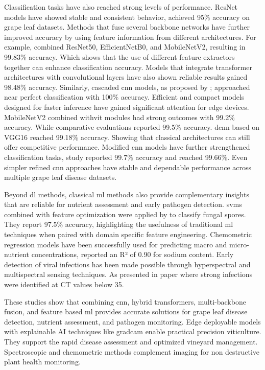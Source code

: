 \documentclass[conference]{IEEEtran}
\begin{document}
Classification tasks have also reached strong levels of performance. ResNet models have showed stable and consistent behavior, \cite{Sagar2025} achieved 95\% accuracy on grape leaf datasets. Methods that fuse several backbone networks have further improved accuracy by using feature information from different architectures. For example, \cite{Vo2026AFCNet} combined ResNet50, EfficientNetB0, and MobileNetV2, resulting in 99.83\% accuracy. Which shows that the use of different feature extractors together can enhance classification accuracy. Models that integrate transformer architectures with convolutional layers have also shown reliable results \cite{Zhang2025Transformer} gained 98.48\% accuracy. Similarly, cascaded \ac{cnn} models, as proposed by \cite{AlNasseri2025}; approached near perfect classification with 100\% accuracy. Efficient and compact models designed for faster inference have gained significant attention for edge devices. MobileNetV2 combined with\ac{vit} modules \cite{Tanvir2025} had strong outcomes with 99.2\% accuracy. While comparative evaluations \cite{Mathew2025} reported 99.5\% accuracy. \ac{dcnn} based on VGG16 \cite{Prasad2024} reached 99.18\% accuracy. Showing that classical architectures can still offer competitive performance. Modified \ac{cnn} models have further strengthened classification tasks, study \cite{Talaat2025} reported 99.7\% accuracy and \cite{Karim2024} reached 99.66\%. Even simpler refined \ac{cnn} approaches \cite{Naik2025} have stable and dependable performance across multiple grape leaf disease datasets.

Beyond \ac{dl} methods, classical \ac{ml} methods also provide complementary insights that are reliable for nutrient assessment and early pathogen detection. \ac{svm}s combined with feature optimization  were applied by \cite{Shi2025} to classify fungal spores. They report 97.5\% accuracy, highlighting the usefulness of traditional \ac{ml} techniques when paired with domain specific feature engineering. Chemometric regression models have been successfully used for predicting macro and micro-nutrient concentrations, \cite{Manzano2025} reported an R² of 0.90 for sodium content. Early detection of viral infections has been made possible through hyperspectral and multispectral sensing techniques. As presented in paper \cite{Lee2024} where strong infections were identified at CT values below 35.

These studies show that combining \ac{cnn}, hybrid transformers, multi-backbone fusion, and feature based \ac{ml} provides accurate solutions for grape leaf disease detection, nutrient assessment, and pathogen monitoring. Edge deployable models with explainable AI techniques like \ac{gradcam} enable practical precision viticulture. They support the rapid disease assessment and optimized vineyard management. Spectroscopic and chemometric methods complement imaging for non destructive plant health monitoring.
\end{document}
